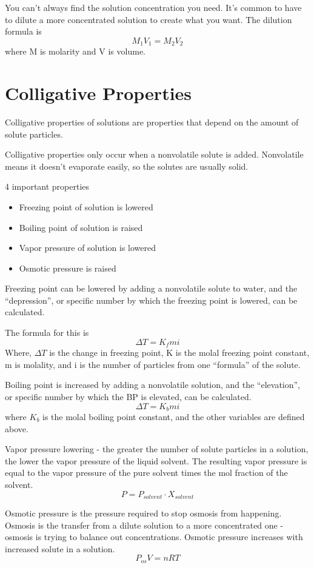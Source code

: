 \documentclass[../hchem.tex]{subfiles}
\begin{document}
You can't always find the solution concentration you need. It's common to have to dilute a more concentrated solution to create what you want.
The dilution formula is 
\[M_1V_1 = M_2V_2\]
where M is molarity and V is volume.
\section{Colligative Properties}
Colligative properties of solutions are properties that depend on the amount of solute particles.

Colligative properties only occur when a nonvolatile solute is added. Nonvolatile means it doesn't evaporate easily, so the solutes are usually solid.

4 important properties
\begin{itemize}
    \item Freezing point of solution is lowered 
    \item Boiling point of solution is raised 
    \item Vapor pressure of solution is lowered 
    \item Osmotic pressure is raised 
\end{itemize}

Freezing point can be lowered by adding a nonvolatile solute to water, and the ``depression'',
or specific number by which the freezing point is lowered, can be calculated.

The formula for this is 
\[\Delta T = K_f mi\]
Where, $\Delta T$ is the change in freezing point, K is the molal freezing point constant, m is molality, and i is the number of particles from one ``formula'' of the solute.

Boiling point is increased by adding a nonvolatile solution, and the ``elevation'', or specific number by which the BP is elevated, can be calculated.
\[\Delta T = K_b mi\]
where $K_b$ is the molal boiling point constant, and the other variables are defined above.

Vapor pressure lowering - the greater the number of solute particles in a solution, the lower the vapor pressure of the liquid solvent.
The resulting vapor pressure is equal to the vapor pressure of the pure solvent times the mol fraction of the solvent.
\[P = P_{solvent}\cdot X_{solvent}\]

Osmotic pressure is the pressure required to stop osmosis from happening. Osmosis is the transfer from a dilute solution 
to a more concentrated one - osmosis is trying to balance out concentrations. Osmotic pressure increases with increased solute in a solution.
\[P_{os}V=nRT\]
\end{document}
